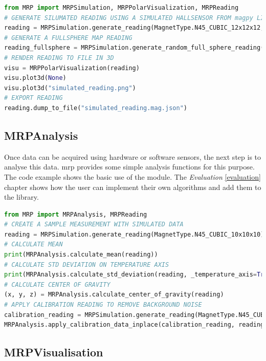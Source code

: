\begin{lstlisting}[language=Python, caption={MRPSimulation example illustrates the usage of several data analysis functions}, label=lst:mrpexample_simulation]
from MRP import MRPSimulation, MRPPolarVisualization, MRPReading
# GENERATE SILUMATED READING USING A SIMULATED HALLSENSOR FROM magpy LIBRARY
reading = MRPSimulation.generate_reading(MagnetType.N45_CUBIC_12x12x12,_add_random_polarisation=True)
# GENERATE A FULLSPHERE MAP READING
reading_fullsphere = MRPSimulation.generate_random_full_sphere_reading()
# RENDER READING TO FILE IN 3D
visu = MRPPolarVisualization(reading)
visu.plot3d(None)
visu.plot3d("simulated_reading.png")
# EXPORT READING
reading.dump_to_file("simulated_reading.mag.json")
\end{lstlisting}

\hypertarget{mrpanalysis}{%
\subsection{MRPAnalysis}\label{mrpanalysis}}

Once data can be acquired using hardware or software sensors, the next
step is to analyse this data. \gls{mrp} provides some simple analysis
functions for this purpose. The code example shows the basic use of the
module. The \emph{Evaluation} \ref{evaluation} chapter shows how the
user can implement their own algorithms and add them to the library.

\begin{lstlisting}[language=Python, caption={MRPAnalysis example code performs several data analysis steps}, label=lst:mrpexample_analysis]
from MRP import MRPAnalysis, MRPReading
# CREATE A SAMPLE MEASUREMENT WITH SIMULATED DATA
reading = MRPSimulation.generate_reading(MagnetType.N45_CUBIC_10x10x10)
# CALCULATE MEAN
print(MRPAnalysis.calculate_mean(reading))
# CALCULATE STD DEVIATION ON TEMPERATURE AXIS
print(MRPAnalysis.calculate_std_deviation(reading, _temperature_axis=True))
# CALCULATE CENTER OF GRAVITY
(x, y, z) = MRPAnalysis.calculate_center_of_gravity(reading)
# APPLY CALIBRATION READING TO REMOVE BACKGROUND NOISE
calibration_reading = MRPSimulation.generate_reading(MagnetType.N45_CUBIC_10x10x10, _ideal = True)
MRPAnalysis.apply_calibration_data_inplace(calibration_reading, reading)
\end{lstlisting}

\hypertarget{mrpvisualisation}{%
\subsection{MRPVisualisation}\label{mrpvisualisation}}

